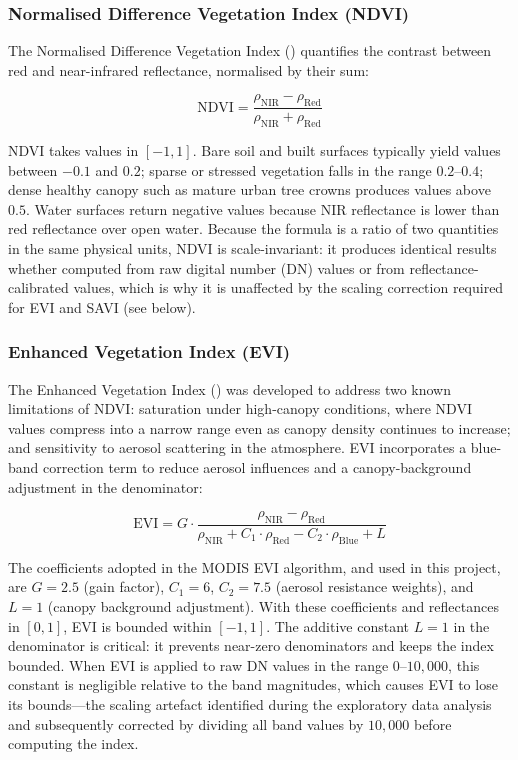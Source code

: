 \subsubsection*{Normalised Difference Vegetation Index (NDVI)}
The Normalised Difference Vegetation Index (\cite{tucker1979}) quantifies the contrast between red and near-infrared reflectance, normalised by their sum:

\begin{equation}
    \text{NDVI} = \frac{\rho_{\text{NIR}} - \rho_{\text{Red}}}
                       {\rho_{\text{NIR}} + \rho_{\text{Red}}}
    \label{eq:ndvi}
\end{equation}

NDVI takes values in $[-1, 1]$. Bare soil and built surfaces typically yield values between $-0.1$ and $0.2$; sparse or stressed vegetation falls in the range $0.2$--$0.4$; dense healthy canopy such as mature urban tree crowns produces values above $0.5$. Water surfaces return negative values because NIR reflectance is lower than red reflectance over open water. Because the formula is a ratio of two quantities in the same physical units, NDVI is scale-invariant: it produces identical results whether computed from raw digital number (DN) values or from reflectance-calibrated values, which is why it is unaffected by the scaling correction required for EVI and SAVI (see below).

\subsubsection*{Enhanced Vegetation Index (EVI)}
The Enhanced Vegetation Index (\cite{huete2002}) was developed to address two known limitations of NDVI: saturation under high-canopy conditions, where NDVI values compress into a narrow range even as canopy density continues to increase; and sensitivity to aerosol scattering in the atmosphere. EVI incorporates a blue-band correction term to reduce aerosol influences and a canopy-background adjustment in the denominator:

\begin{equation}
    \text{EVI} = G \cdot
        \frac{\rho_{\text{NIR}} - \rho_{\text{Red}}}
             {\rho_{\text{NIR}} + C_1 \cdot \rho_{\text{Red}}
              - C_2 \cdot \rho_{\text{Blue}} + L}
    \label{eq:evi}
\end{equation}

The coefficients adopted in the MODIS EVI algorithm, and used in this project, are $G = 2.5$ (gain factor), $C_1 = 6$, $C_2 = 7.5$ (aerosol resistance weights), and $L = 1$ (canopy background adjustment). With these coefficients and reflectances in $[0, 1]$, EVI is bounded within $[-1, 1]$. The additive constant $L = 1$ in the denominator is critical: it prevents near-zero denominators and keeps the index bounded. When EVI is applied to raw DN values in the range $0$--$10{,}000$, this constant is negligible relative to the band magnitudes, which causes EVI to lose its bounds---the scaling artefact identified during the exploratory data analysis and subsequently corrected by dividing all band values by $10{,}000$ before computing the index.

